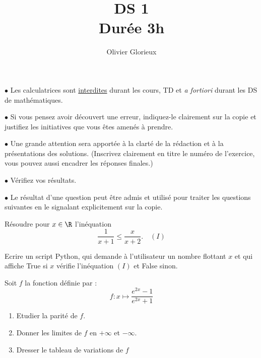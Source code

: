 \documentclass[a4paper, 11pt,reqno]{article}
\author{Olivier Glorieux}
\begin{document}
\title{DS 1\\
\Large{Durée 3h}
}

\vspace{1cm}
\begin{center}

\begin{description}
\item$\bullet$ Les calculatrices sont \underline{interdites} durant les cours, TD et \emph{a fortiori} durant les DS de mathématiques. \\

\item $\bullet $ Si vous pensez avoir découvert une erreur, indiquez-le clairement sur la copie et justifiez les initiatives que vous êtes amenés à prendre. \\

\item $\bullet$ Une grande attention sera apportée à la clarté de la rédaction et à la présentations des solutions. (Inscrivez clairement en titre le numéro de l'exercice, vous pouvez aussi encadrer les réponses finales.)  \\

\item $\bullet$ Vérifiez vos résultats. \\

\item $\bullet$ Le résultat d'une question peut être admis et utilisé pour traiter les questions suivantes en le signalant explicitement sur la copie. 
\end{description}

\end{center} 
\vspace{2cm}


\begin{exercice}
Résoudre pour $x \in \R$ l'inéquation $$\frac{1}{x+1}\leq \frac{x}{x+2}. \quad (I)$$

Ecrire un script Python, qui demande à l'utilisateur un nombre flottant $x$ et qui affiche  True si $x$ vérifie l'inéquation $(I)$ et False sinon. 
\end{exercice}
\vspace{1cm}


\begin{exercice}
Soit $f$ la fonction définie par :
$$f : x\mapsto \frac{e^{2x} -1}{e^{2x}+1}$$
\begin{enumerate}
\item Etudier la parité de $f$. 
\item Donner les limites de $f$  en $+\infty $ et $-\infty$. 
\item Dresser le tableau de variations de $f$ 
\end{enumerate}
\end{exercice}
\end{document}
